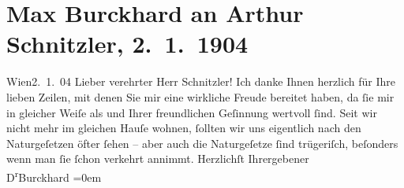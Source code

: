 

               \section[Max Burckhard an Arthur Schnitzler, 2. 1. 1904]{ Max Burckhard an Arthur Schnitzler, 2. 1. 1904}\nopagebreak{}\rehead{ }\begin{ledgroupsized}[t]{13cm}\normalsize\beginnumbering{} \toendnotes[C]{\smallbreak\pagebreak[2]} 
\toendnotes[C]{\smallbreak}\pstart
           \raggedleft{}{\pb}Wien2. 1. 04\pend
           \pstart{}Lieber verehrter Herr Schnitzler!\pend\pstart
           Ich danke Ihnen herzlich für Ihre lieben Zeilen, mit denen Sie mir eine wirkliche
                    Freude bereitet haben, da ſie mir in gleicher Weiſe als \label{K_L01355_1v}\label{K_L01355_1h} und Ihrer
                    freundlichen Geſinnung wertvoll ſind. Seit wir nicht mehr im gleichen Hauſe
                    wohnen, ſollten wir uns eigentlich nach den Naturgeſetzen öfter ſehen – aber {\pb}auch die Naturgeſetze ſind
                    trügeriſch, beſonders wenn man ſie ſchon verkehrt annimmt.\pend
           \pstart
           Herzlichſt Ihr\hspace*{1.5em}ergebener{\\[\baselineskip]}\spacefill\mbox{D\textsuperscript{r}Burckhard}\pend
           \leftskip=0em{}          \endnumbering{}\end{ledgroupsized}  \newcommand{\dateiname}{L01355}\newcommand{\titel}{Max Burckhard an Arthur Schnitzler, 2. 1. 1904}\newcommand{\editorInnen}{Martin Anton Müller und Gerd-Hermann Susen}
            \footnotesize
\begin{ledgroupsized}[t]{11.5cm}
\end{ledgroupsized}
         
      